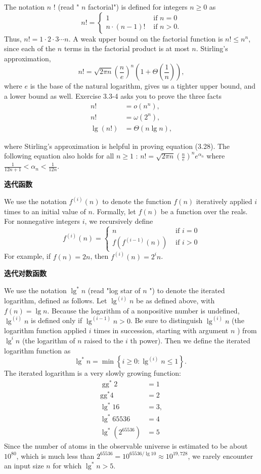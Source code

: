 \documentclass[lang=cn,newtx,10pt,scheme=chinese]{elegantbook}
\begin{document}
The notation $n$ ! (read " $n$ factorial") is defined for integers $n \geq 0$ as
$$
n != \begin{cases}1 & \text { if } n=0 \\ n \cdot(n-1) ! & \text { if } n>0 .\end{cases}
$$
Thus, $n !=1 \cdot 2 \cdot 3 \cdots n$.
A weak upper bound on the factorial function is $n ! \leq n^n$, since each of the $n$ terms in the factorial product is at most $n$. Stirling's approximation,
$$
n !=\sqrt{2 \pi n}\left(\frac{n}{e}\right)^n\left(1+\Theta\left(\frac{1}{n}\right)\right),
$$
where $e$ is the base of the natural logarithm, gives us a tighter upper bound, and a lower bound as well. Exercise 3.3-4 asks you to prove the three facts
$$
\begin{aligned}
n ! & =o\left(n^n\right), \\
n ! & =\omega\left(2^n\right), \\
\lg (n !) & =\Theta(n \lg n),
\end{aligned}
$$

where Stirling's approximation is helpful in proving equation (3.28). The following equation also holds for all $n \geq 1$ :
$n !=\sqrt{2 \pi n}\left(\frac{n}{e}\right)^n e^{\alpha_n}$
where
$\frac{1}{12 n+1}<\alpha_n<\frac{1}{12 n}$.

\textbf{迭代函数}

We use the notation $f^{(i)}(n)$ to denote the function $f(n)$ iteratively applied $i$ times to an initial value of $n$. Formally, let $f(n)$ be a function over the reals. For nonnegative integers $i$, we recursively define
$$
f^{(i)}(n)= \begin{cases}n & \text { if } i=0 \\ f\left(f^{(i-1)}(n)\right) & \text { if } i>0\end{cases}
$$
For example, if $f(n)=2 n$, then $f^{(i)}(n)=2^i n$.

\textbf{迭代对数函数}

We use the notation $\lg ^* n$ (read "log star of $n$ ") to denote the iterated logarithm, defined as follows. Let $\lg ^{(i)} n$ be as defined above, with $f(n)=\lg n$. Because the logarithm of a nonpositive number is undefined, $\lg ^{(i)} n$ is defined only if $\lg ^{(i-1)} n>0$. Be sure to distinguish $\lg ^{(i)} n$ (the logarithm function applied $i$ times in succession, starting with argument $n$ ) from $\lg ^i n$ (the logarithm of $n$ raised to the $i$ th power). Then we define the iterated logarithm function as
$$
\lg ^* n=\min \left\{i \geq 0: \lg ^{(i)} n \leq 1\right\} \text {. }
$$
The iterated logarithm is a very slowly growing function:
$$
\begin{aligned}
\operatorname{gg}^* 2 & =1 \\
\mathrm{gg}^* 4 & =2 \\
\lg ^* 16 & =3, \\
\lg ^* 65536 & =4 \\
\lg ^*\left(2^{65536}\right) & =5
\end{aligned}
$$
Since the number of atoms in the observable universe is estimated to be about $10^{80}$, which is much less than $2^{65536}=10^{65536 / \lg 10} \approx 10^{19,728}$, we rarely encounter an input size $n$ for which $\lg ^* n>5$.
\end{document}
